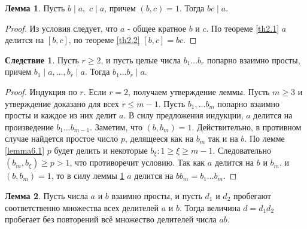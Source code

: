 \documentclass[a4paper, 12pt]{article}
\renewcommand{\div}{\mid}
\theoremstyle{definition}
\newtheorem*{consequense}{Следствие}
\newtheorem{lemma}{Лемма}[section]
\begin{document}
    \begin{lemma} \label{lemma6.2}
        Пусть $b\div a,$ $c\div a$, причем $(b,c)=1$. Тогда $bc\div a$.
    \end{lemma}
    \begin{proof}
        Из условия следует, что $a$ - общее кратное $b$ и $c$. По теореме \ref{th2.1} $a$ делится на $[b,c]$, по теореме \ref{th2.2} $[b,c]=bc$.
    \end{proof}
    \begin{consequense}
        Пусть $r\geq 2$, и пусть целые числа $b_1\dots b_r$ попарно взаимно просты, причем $b_1 \div a, \dots, b_r \div a$. Тогда $b_1\dots b_r \div a$.
    \end{consequense} 
    \begin{proof}
        Индукция по $r$. Если $r=2$, получаем утверждение леммы. Пусть $m\geq 3$ и утверждение доказано для всех $r\leq m-1$. Пусть $b_1, \dots b_m$ попарно взаимно просты и каждое из них делит $a$. В силу предложения индукции, $a$ делится на произведение $b_1\dots b_{m-1}$. Заметим, что $(b,b_m)=1$. Действительно, в противном случае найдется простое число $p$, делящееся как на $b_m$ так и на $b$. По лемме \ref{lemma6.1} $p$ будет делить и некоторые $b_{\xi}: 1\geq \xi \geq m-1$. Следовательно $(b_m,b_{\xi})\geq p>1$, что противоречит условию. Так как $a$ делится на $b$ и $b_m$, и $(b, b_m)=1$, то в силу леммы \ref{lemma6.2} $a$ делится на $bb_m=b_1\dots b_m$.
    \end{proof}
    \begin{lemma} \label{lemma6.3}
        Пусть числа $a$ и $b$ взаимно просты, и пусть $d_1$ и $d_2$ пробегают соответственно множества всех делителей $a$ и $b$. Тогда величина $d=d_1d_2$ пробегает без повторений всё множество делителей числа $ab$.
    \end{lemma} 
\end{document}
